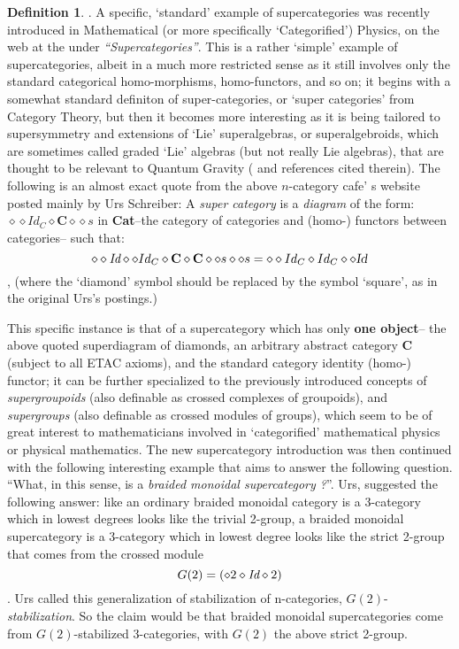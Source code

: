\documentclass[12pt]{article}
\theoremstyle{plain}
\theoremstyle{definition}
\newtheorem{definition}{Definition}[section]
\numberwithin{equation}{section}
\begin{document}
\begin{definition}.
A specific, `standard' example of supercategories was recently introduced in Mathematical (or more specifically `Categorified') Physics,  on the web at the
 under \textit{``Supercategories''}. This is a rather `simple' example of supercategories, albeit in a much more restricted sense as it still involves only the standard categorical homo-morphisms, homo-functors, and so on; it begins with a somewhat standard definiton of super-categories, or `super categories' from Category Theory, but then it becomes more interesting as it is being tailored to supersymmetry and extensions of `Lie' superalgebras, or superalgebroids, which are sometimes called graded `Lie' algebras (but not really Lie algebras),  that are thought to be relevant to Quantum Gravity (\cite{BGB2} and references cited therein). The following is an almost exact quote from the above $n$-category cafe' s website posted mainly by Urs Schreiber:  
A \textit{super category} is a \textit{diagram} of the form: 
$\diamond  \diamond Id_C \diamond \textbf{C} \diamond \diamond s$ in \textbf{Cat}--the category of categories and (homo-) functors between categories-- such that: 
$$\diamond  \diamond \emph{Id} \diamond \diamond Id_C \diamond \textbf{C} \diamond \textbf{C}\diamond \diamond s \diamond \diamond s = \diamond  \diamond Id_C \diamond Id_C  \diamond  \diamond \textsl{Id}$$, 
(where the `diamond' symbol should be replaced by the symbol `square', as in the original Urs's postings.) 
\end{definition} 

This specific instance is that of a supercategory which has only \textbf{one object}-- the above quoted superdiagram of diamonds, an arbitrary abstract category \textbf{C} (subject to all ETAC axioms), and the standard category identity (homo-) functor; it can be further specialized to the previously introduced concepts of \emph{supergroupoids} (also definable as crossed complexes of groupoids), and \textit{supergroups} (also definable as crossed modules of groups), which seem to be of great interest to mathematicians involved in `categorified' mathematical physics or physical mathematics. The new supercategory introduction was then continued with the following interesting example that aims to answer the following question. ``What, in this sense, is a \emph{braided monoidal supercategory ?}''.  Urs, suggested the following answer: like an ordinary braided monoidal category is a 3-category which in lowest degrees looks like the trivial 2-group, a braided monoidal supercategory is a 3-category which in lowest degree looks like the strict 2-group that comes from the crossed module $$G(2)=(\diamond 2 \diamond \emph{Id} \diamond 2)$$. Urs called this generalization of stabilization of n-categories, $G(2)$- \emph{stabilization}. So the claim would be that braided monoidal supercategories come from $G(2)$-stabilized 3-categories, with $G(2)$ the above strict 2-group.
\end{document}
